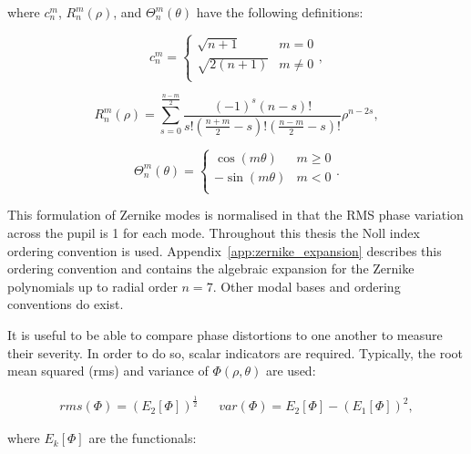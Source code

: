 where $c^{m}_{n}$, $R^{m}_{n}(\rho)$, and $\Theta^{m}_{n}(\theta)$ have the following definitions:

\begin{equation}\label{eq:zernike_polynomial_c}
c^{m}_{n} = 
\begin{cases}
\sqrt{n + 1} & m = 0\\
\sqrt{2(n + 1)} & m \ne 0\\
\end{cases},
\end{equation}

\begin{equation}\label{eq:zernike_polynomial_R}
R^{m}_{n}(\rho) = \sum_{s=0}^{\frac{n-m}{2}}{\frac{(-1)^{s}(n-s)!}{s!\left(\frac{n+m}{2}-s\right)!\left(\frac{n-m}{2}-s\right)!}\rho^{n-2s}},
\end{equation}

\begin{equation}\label{eq:zernike_polynomial_Theta}
\Theta^{m}_{n}(\theta) =
\begin{cases}
\cos(m\theta) & m \ge 0\\
-\sin(m\theta) & m < 0\\
\end{cases}.
\end{equation}

This formulation of Zernike modes is normalised in that the RMS phase 
variation across the pupil is 1 for each mode. Throughout this thesis the 
Noll index ordering convention is used\cite{noll1976zernike}. 
Appendix~\ref{app:zernike_expansion} describes this ordering convention and 
contains the algebraic expansion for the Zernike polynomials up to radial 
order $n = 7$. Other modal bases and ordering conventions do 
exist\cite{thibos2002standards,loomis1978computer,soloviev2017optimal,
	burton1984effects}. 

It is useful to be able to compare phase distortions to one another to
measure their severity. In order to do so, scalar indicators are required.
Typically, the root mean squared (rms) and variance of $\Phi\left(\rho,\theta\right)$
are used:

\begin{align}\label{eq:scalar_indicators}
rms(\Phi) = \left(E_{2}\left[\Phi\right]\right)^{\frac{1}{2}} && 
var(\Phi) = E_{2}\left[\Phi\right] - \left(E_{1}\left[\Phi\right]\right)^{2},
\end{align}

where $E_{k}\left[\Phi\right]$ are the 
functionals\cite{antonello2014optimisation,mahajan1994zernike}:

